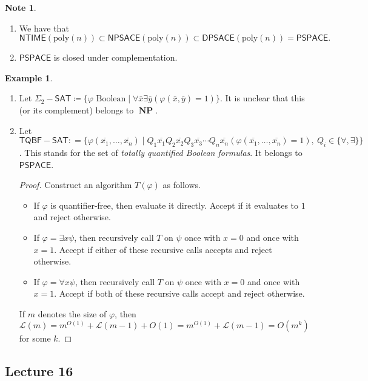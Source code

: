 \documentclass[10pt,letterpaper,cm]{nupset}
\theoremstyle{definition}
\newtheorem{exmp}{Example}
\newtheorem{note}{Note}
\newcommand{\1}{\mathbf{1}}
\newcommand{\0}{\vec 0}
\DeclareMathOperator{\NP}{\mathbf{NP}}
\begin{document}
\begin{note} $ $
\begin{enumerate}
\item We have that $\mathsf{NTIME}(\text{poly}(n)) \subset \mathsf{NPSACE}(\text{poly}(n)) \subset \mathsf{DPSACE}(\text{poly}(n)) = \mathsf{PSPACE}.$
\item $\mathsf{PSPACE}$ is closed under complementation. 
\end{enumerate}
\end{note}

\begin{exmp} $ $
\begin{enumerate}
\item Let $\Sigma_2{-}\mathsf{SAT} \coloneqq \{\varphi \text{ Boolean} \mid \forall \bar{x} \exists \bar{y}(\varphi(\bar{x}, \bar{y}) = 1)\}$. It is unclear that this (or its complement) belongs to $\NP$. 
\item Let $\mathsf{TQBF{-}SAT} : = \{ \varphi(\overline{x_1}, \ldots, \overline{x_n}) \mid Q_1 \overline{x_1} Q_2 \overline{x_2}Q_3 \overline{x_3} \cdots Q_n \overline{x_n} (\varphi(\overline{x_1}, \ldots, \overline{x_n}) = 1), \ Q_i \in \{\forall, \exists\} \}$. This stands for the set of \textit{totally quantified Boolean formulas}. It belongs to $\mathsf{PSPACE}$.
\begin{proof}
Construct an algorithm $T(\varphi)$ as follows. 
\begin{itemize}
\item If $\varphi$ is quantifier-free, then evaluate it directly. Accept if it evaluates to $1$ and reject otherwise. 
\item If $\varphi = \exists x \psi$, then recursively call $T$ on $\psi$ once with $x=0$ and once with $x=1$. Accept if either of these recursive calls accepts and reject otherwise. 
\item If  $\varphi = \forall x \psi$, then recursively call $T$ on $\psi$ once with $x=0$ and once with $x=1$. Accept if both of these recursive calls accept and reject otherwise. 
\end{itemize} 
If $m$ denotes the size of $\varphi$, then $\mathcal{L}(m) = m^{O(1)} + \mathcal{L}(m-1) + O(1) = m^{O(1)} + \mathcal{L}(m-1) = O(m^k)$ for some $k$.
\end{proof}
\end{enumerate}
\end{exmp}

\subsection{Lecture 16}
\end{document}
